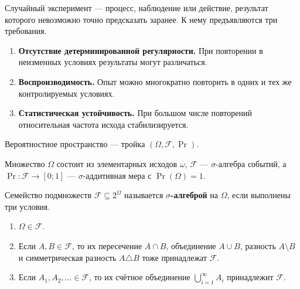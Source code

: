 
\begin{definition}
Случайный эксперимент — процесс, наблюдение или действие, результат которого невозможно точно предсказать заранее. К нему предъявляются три требования.
\begin{enumerate}
\item \textbf{Отсутствие детерминированной регулярности.} При повторении в неизменных условиях результаты могут различаться.
\item \textbf{Воспроизводимость.} Опыт можно многократно повторить в одних и тех же контролируемых условиях.
\item \textbf{Статистическая устойчивость.} При большом числе повторений относительная частота исхода стабилизируется.
\end{enumerate}
\end{definition}

\begin{definition}
Вероятностное пространство — тройка $(\Omega,\mathcal F,\Pr)$.

\smallskip
Множество $\Omega$ состоит из элементарных исходов $\omega$, $\mathcal F$ — $\sigma$-алгебра событий, а $\Pr\colon\mathcal F\to[0;1]$ — $\sigma$-аддитивная мера с $\Pr(\Omega)=1$.
\end{definition}

\begin{definition}
Семейство подмножеств $\mathcal F\subseteq 2^\Omega$ называется
\textbf{$\sigma$-алгеброй} на $\Omega$, если выполнены три условия.
\begin{enumerate}[label=\arabic*)]
\item $\Omega\in\mathcal F$.
\item Если $A,B\in\mathcal F$, то их пересечение $A\cap B$, объединение
      $A\cup B$, разность $A\setminus B$ и симметрическая разность
      $A\triangle B$ тоже принадлежат $\mathcal F$.
\item Если $A_1,A_2,\ldots\in\mathcal F$, то их счётное объединение
      $\bigcup_{i=1}^{\infty}A_i$ принадлежит $\mathcal F$.
\end{enumerate}
\end{definition}

